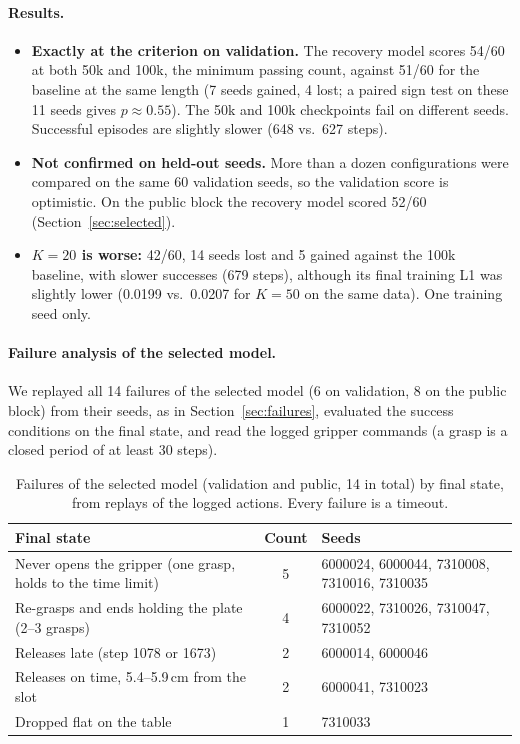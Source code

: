 \documentclass[11pt,a4paper]{article}
\begin{document}
\paragraph{Results.}
\begin{itemize}
  \item \textbf{Exactly at the criterion on validation.} The recovery model
        scores 54/60 at both 50k and 100k, the minimum passing count, against
        51/60 for the baseline at the same length (7 seeds gained, 4 lost; a
        paired sign test on these 11 seeds gives $p\approx0.55$). The 50k and
        100k checkpoints fail on different seeds. Successful episodes are
        slightly slower (648 vs.\ 627 steps).
  \item \textbf{Not confirmed on held-out seeds.} More than a dozen
        configurations were compared on the same 60 validation seeds, so the
        validation score is optimistic. On the public block the recovery
        model scored 52/60 (Section~\ref{sec:selected}).
  \item \textbf{$K=20$ is worse:} 42/60, 14 seeds lost and 5 gained against
        the 100k baseline, with slower successes (679 steps),
        although its final training L1 was slightly lower (0.0199 vs.\
        0.0207 for $K=50$ on the same data). One training seed only.
\end{itemize}

\paragraph{Failure analysis of the selected model.} We replayed all 14
failures of the selected model (6 on validation, 8 on the public block)
from their seeds, as in Section~\ref{sec:failures}, evaluated the success
conditions on the final state, and read the logged gripper commands (a
grasp is a closed period of at least 30 steps).

\begin{table}[h]
\centering
\begin{tabular}{p{6.4cm}cp{6.2cm}}
\toprule
Final state & Count & Seeds \\
\midrule
Never opens the gripper (one grasp, holds to the time limit) & 5 &
  6000024, 6000044, 7310008, 7310016, 7310035 \\
Re-grasps and ends holding the plate (2--3 grasps) & 4 &
  6000022, 7310026, 7310047, 7310052 \\
Releases late (step 1078 or 1673) & 2 & 6000014, 6000046 \\
Releases on time, 5.4--5.9\,cm from the slot & 2 & 6000041, 7310023 \\
Dropped flat on the table & 1 & 7310033 \\
\bottomrule
\end{tabular}
\caption{Failures of the selected model (validation and public, 14 in
total) by final state, from replays of the logged actions. Every failure is
a timeout.}
\label{tab:recovery-failures}
\end{table}
\end{document}
